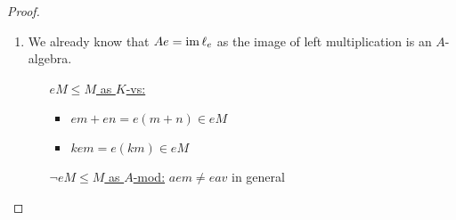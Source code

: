\documentclass[]{article}
\begin{document}
\begin{proof}
    \begin{enumerate}
        \item We already know that \(Ae = \operatorname{im} \ell_e\) as the image of left multiplication is an \(A\)-algebra.
        
        \begin{itemize}
            \item[\underline{\(eM \leq M\) as \(K\)-vs:}]
                    \begin{itemize}
                        \item \(em+en=e(m+n) \in eM\)
                        \item \(kem = e(km) \in eM\)
                    \end{itemize} 

            \item[\underline{\(\lnot eM \leq M\) as \(A\)-mod:}]
            \(aem \neq eav\) in general 


\end{itemize}
\end{enumerate}
\end{proof}
\end{document}

